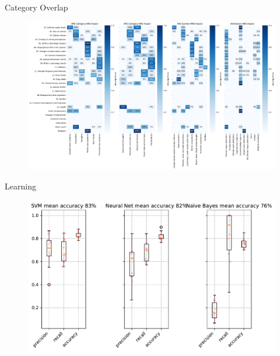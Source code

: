 \documentclass[9pt]{beamer}
\begin{document}
\begin{frame}{Category Overlap}

\begin{figure}	
	\hspace*{-0.05\linewidth}\includegraphics[width=1.1\linewidth]{../plots/progress/AR6_Impact_overlap.pdf}
\end{figure}

\end{frame}

\begin{frame}{Learning}

\begin{figure}	
	\includegraphics[width=1\linewidth]{../plots/prediction_models/relevance_prediction_2020-03-12_11:36:25.pdf}
\end{figure}

\end{frame}
\end{document}
